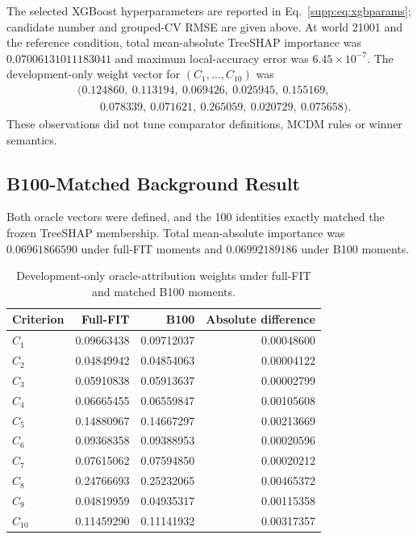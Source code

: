 \documentclass[runningheads,orivec]{llncs}
\begin{document}
The selected XGBoost hyperparameters are reported in Eq.~\eqref{supp:eq:xgbparams}; candidate
number and grouped-CV RMSE are given above. At world 21001 and the reference condition, total mean-absolute
TreeSHAP importance was $0.07006131011183041$ and maximum local-accuracy error was
$6.45\times10^{-7}$. The development-only weight vector for $(C_1,\ldots,C_{10})$ was
\begin{equation}
\begin{split}
&(0.124860,\ 0.113194,\ 0.069426,\ 0.025945,\ 0.155169,\\
&\qquad 0.078339,\ 0.071621,\ 0.265059,\ 0.020729,\ 0.075658).
\end{split}
\label{supp:eq:devshapweights}
\end{equation}
These observations did not tune comparator definitions, MCDM rules or winner semantics.

\subsection{B100-Matched Background Result}

Both oracle vectors were defined, and the 100 identities exactly matched the frozen TreeSHAP
membership. Total mean-absolute importance was $0.06961866590$ under full-FIT moments and
$0.06992189186$ under B100 moments.

\begin{table}[t]
\centering
\caption{Development-only oracle-attribution weights under full-FIT and matched B100 moments.}
\label{supp:tab:b100weights}
\small
\begin{tabular}{@{}lrrr@{}}
\toprule
Criterion & Full-FIT & B100 & Absolute difference\\
\midrule
$C_1$  & 0.09663438 & 0.09712037 & 0.00048600\\
$C_2$  & 0.04849942 & 0.04854063 & 0.00004122\\
$C_3$  & 0.05910838 & 0.05913637 & 0.00002799\\
$C_4$  & 0.06665455 & 0.06559847 & 0.00105608\\
$C_5$  & 0.14880967 & 0.14667297 & 0.00213669\\
$C_6$  & 0.09368358 & 0.09388953 & 0.00020596\\
$C_7$  & 0.07615062 & 0.07594850 & 0.00020212\\
$C_8$  & 0.24766693 & 0.25232065 & 0.00465372\\
$C_9$  & 0.04819959 & 0.04935317 & 0.00115358\\
$C_{10}$ & 0.11459290 & 0.11141932 & 0.00317357\\
\bottomrule
\end{tabular}
\end{table}
\end{document}
